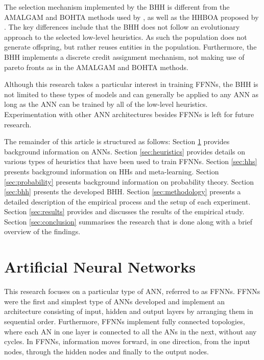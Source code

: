 \documentclass[preprint,review,12pt]{elsarticle}
\begin{document}
The selection mechanism implemented by the \acs{BHH} is different from the \acf{AMALGAM} and \acf{BOHTA} methods used by \citet{ref:nel:2021}, as well as the \acf{HHBOA} proposed by \citet{ref:oliva:2019}. The key differences include that the \acs{BHH} does not follow an evolutionary approach to the selected low-level heuristics. As such the population does not generate offspring, but rather reuses entities in the population. Furthermore, the \acs{BHH} implements a discrete credit assignment mechanism, not making use of pareto fronts as in the \acs{AMALGAM} and \acs{BOHTA} methods.

Although this research takes a particular interest in training \acp{FFNN}, the \acs{BHH} is not limited to these types of models and can generally be applied to any \acs{ANN} as long as the \acs{ANN} can be trained by all of the low-level heuristics. Experimentation with other \acs{ANN} architectures besides \acp{FFNN} is left for future research.

The remainder of this article is structured as follows: Section \ref{sec:anns} provides background information on \acp{ANN}. Section \ref{sec:heuristics} provides details on various types of heuristics that have been used to train \acp{FFNN}. Section \ref{sec:hhs} presents background information on \acp{HH} and meta-learning. Section \ref{sec:probability} presents background information on probability theory. Section \ref{sec:bhh} presents the developed \acs{BHH}. Section \ref{sec:methodology} presents a detailed description of the empirical process and the setup of each experiment. Section \ref{sec:results} provides and discusses the results of the empirical study. Section \ref{sec:conclusion} summarises the research that is done along with a brief overview of the findings.

\section{Artificial Neural Networks}
\label{sec:anns}

This research focuses on a particular type of \acs{ANN}, referred to as \acfp{FFNN}. \acp{FFNN} were the first and simplest type of \acp{ANN} developed \citep{ref:schmidhuber:2015} and implement an architecture consisting of input, hidden and output layers by arranging them in sequential order. Furthermore, \acp{FFNN} implement fully connected topologies, where each \acf{AN} in one layer is connected to all the \acp{AN} in the next, without any cycles. In \acp{FFNN}, information moves forward, in one direction, from the input nodes, through the hidden nodes and finally to the output nodes.
\end{document}
